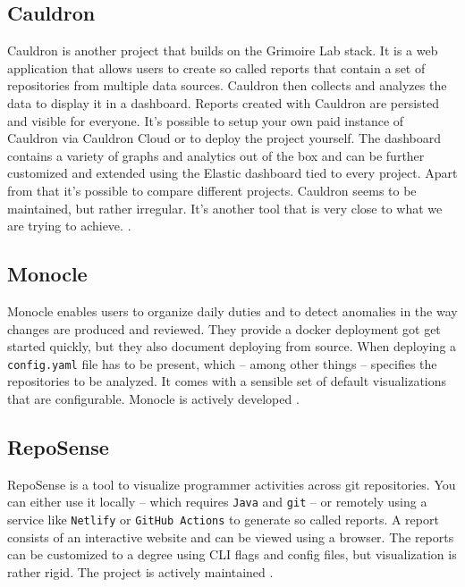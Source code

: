 \documentclass[authoryear,preprint,review,12pt]{elsarticle}
\newcommand{\code}[1]{\colorbox{mygray}{\vphantom{Tg}\lstinline|#1|}}
\begin{document}
\subsection{Cauldron}
\label{sec:summary:cauldron}

Cauldron is another project that builds on the Grimoire Lab stack. It is a web application that
allows users to create so called reports that contain a set of repositories from multiple data
sources. Cauldron then collects and analyzes the data to display it in a dashboard. Reports created
with Cauldron are persisted and visible for everyone. It's possible to setup your own paid instance
of Cauldron via Cauldron Cloud \citep{CauldronCloud} or to deploy the project yourself. The
dashboard contains a variety of graphs and analytics out of the box and can be further customized
and extended using the Elastic dashboard tied to every project. Apart from that it's possible to
compare different projects. Cauldron seems to be maintained, but rather irregular. It's another
tool that is very close to what we are trying to achieve.
\citep{CauldronCauldron,LevelSoftwareDevelopment}.

\subsection{Monocle}
\label{sec:summary:monocle}

Monocle enables users to organize daily duties and to detect anomalies in the way changes are
produced and reviewed. They provide a docker deployment got get started quickly, but they also
document deploying from source. When deploying a \code{config.yaml} file has to be present, which –
among other things – specifies the repositories to be analyzed. It comes with a sensible set of
default visualizations that are configurable. Monocle is actively developed \citep{Monocle2022}.

\subsection{RepoSense}
\label{sec:summary:reposense}

RepoSense is a tool to visualize programmer activities across git repositories. You can either use
it locally – which requires \code{Java} and \code{git} – or remotely using a service like
\code{Netlify} or \code{GitHub Actions} to generate so called reports. A report consists of an
interactive website and can be viewed using a browser. The reports can be customized to a degree
using CLI flags and config files, but visualization is rather rigid. The project is actively
maintained \citep{RepoSense2022}.
\end{document}
